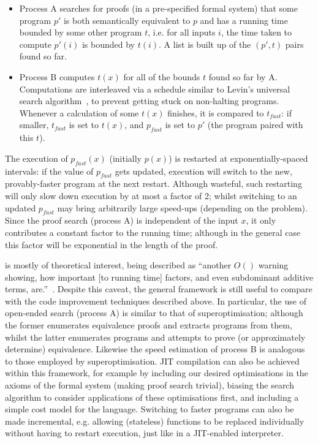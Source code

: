 \begin{itemize}
\item Process A searches for proofs (in a pre-specified formal system) that some
  program $p\prime$ is both semantically equivalent to $p$ and has a running
  time bounded by some other program $t$, i.e. for all inputs $i$, the
  time taken to compute $p\prime(i)$ is bounded by $t(i)$. A list is built up of
  the $(p\prime, t)$ pairs found so far.
\item Process B computes $t(x)$ for all of the bounds $t$ found so far by A.
  Computations are interleaved via a schedule similar to Levin's universal
  search algorithm~\iffalse TODO: Cite \fi, to prevent getting stuck on
  non-halting programs. Whenever a calculation of some $t(x)$ finishes, it is
  compared to $t_{fast}$: if smaller, $t_{fast}$ is set to $t(x)$, and $p_{fast}$ is
  set to $p\prime$ (the program paired with this $t$).
\end{itemize}

The execution of $p_{fast}(x)$ (initially $p(x)$) is restarted at
exponentially-spaced intervals: if the value of $p_{fast}$ gets updated,
execution will switch to the new, provably-faster program at the next restart.
Although wasteful, such restarting will only slow down execution by at most a
factor of 2; whilst switching to an updated $p_{fast}$ may bring arbitrarily large
speed-ups (depending on the problem). Since the proof search (process A) is
independent of the input $x$, it only contributes a constant factor to the
running time; although in the general case this factor will be exponential in
the length of the proof.

\hsearch{} is mostly of theoretical interest, being described as ``another $O()$
warning showing, how important [to running time] factors, and even subdominant
additive terms, are.''~\cite{TODO: Hutter, page 4}. Despite this caveat, the
general framework is still useful to compare with the code improvement
techniques described above. In particular, the use of open-ended search (process
A) is similar to that of superoptimisation; although the former enumerates
equivalence proofs and extracts programs from them, whilst the latter enumerates
programs and attempts to prove (or approximately determine)
equivalence. Likewise the speed estimation of process B is analogous to those
employed by superoptimisation. JIT compilation can also be achieved within this
framework, for example by including our desired optimisations in the axioms of
the formal system (making proof search trivial), biasing the search algorithm to
consider applications of these optimisations first, and including a simple cost
model for the language. Switching to faster programs can also be made
incremental, e.g. allowing (stateless) functions to be replaced individually
without having to restart execution, just like in a JIT-enabled interpreter.

